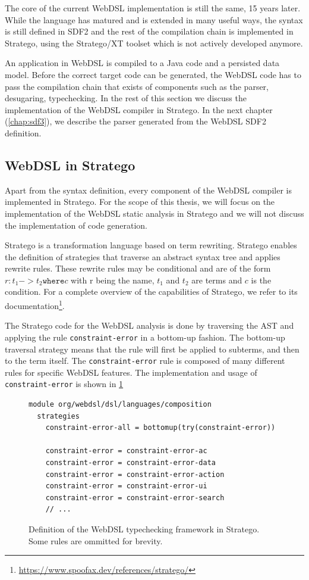     The core of the current WebDSL implementation is still the same, 15 years later. While the language has matured and is extended in many useful ways, the syntax is still defined in SDF2 and the rest of the compilation chain is implemented in Stratego, using the Stratego/XT toolset which is not actively developed anymore.
    
    An application in WebDSL is compiled to a Java code and a persisted data model. Before the correct target code can be generated, the WebDSL code has to pass the compilation chain that exists of components such as the parser, desugaring, typechecking. In the rest of this section we discuss the implementation of the WebDSL compiler in Stratego. In the next chapter (\cref{chap:sdf3}), we describe the parser generated from the WebDSL SDF2 definition.

    \subsection{WebDSL in Stratego}

      Apart from the syntax definition, every component of the WebDSL compiler is implemented in Stratego. For the scope of this thesis, we will focus on the implementation of the WebDSL static analysis in Stratego and we will not discuss the implementation of code generation.

      Stratego \autocite{BravenboerDOV06,VisserBT98} is a transformation language based on term rewriting. Stratego enables the definition of strategies that traverse an abstract syntax tree and applies rewrite rules. These rewrite rules may be conditional and are of the form $r : t_1 -> t_2 \texttt{where} c$ with r being the name, $t_1$ and $t_2$ are terms and $c$ is the condition. For a complete overview of the capabilities of Stratego, we refer to its documentation\footnote{\url{https://www.spoofax.dev/references/stratego/}}.

      The Stratego code for the WebDSL analysis is done by traversing the AST and applying the rule \texttt{constraint-error} in a bottom-up fashion. The bottom-up traversal strategy means that the rule will first be applied to subterms, and then to the term itself. The \texttt{constraint-error} rule is composed of many different rules for specific WebDSL features. The implementation and usage of \texttt{constraint-error} is shown in \cref{fig:webdsl-stratego-constraint-error}

      \begin{figure}
        \begin{verbatim}
module org/webdsl/dsl/languages/composition
  strategies
    constraint-error-all = bottomup(try(constraint-error))

    constraint-error = constraint-error-ac
    constraint-error = constraint-error-data
    constraint-error = constraint-error-action
    constraint-error = constraint-error-ui
    constraint-error = constraint-error-search
    // ...
        \end{verbatim}
        \caption{\label{fig:webdsl-stratego-constraint-error}Definition of the WebDSL typechecking framework in Stratego. Some rules are ommitted for brevity.}
      \end{figure}

